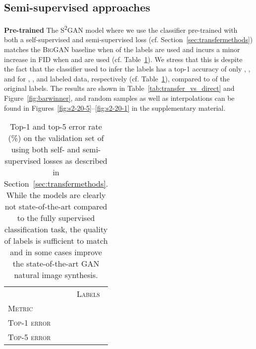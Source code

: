 \documentclass{article}
\newcommand{\tranSS}{\textsc{S\textsuperscript{2}GAN}}
\newcommand{\biggan}{\textsc{BigGAN}}
\begin{document}
\subsection{Semi-supervised approaches}
\textbf{Pre-trained}\quad
The \tranSS{} model where we use the classifier pre-trained with both a self-supervised and semi-supervised loss (cf. Section~\ref{sec:transfermethods}) matches the \biggan{} baseline when  of the labels are used and incurs a minor increase in FID when  and  are used (cf. Table~\ref{tab:semi_self_supervision}). We stress that this is despite the fact that the classifier used to infer the labels has a top-1 accuracy of only , , and  for , , and  labeled data, respectively (cf. Table~\ref{tab:semi_self_supervision}), compared to  of the original labels. The results are shown in Table~\ref{tab:transfer_vs_direct} and Figure~\ref{fig:barwinner}, and random samples as well as interpolations can be found in Figures~\ref{fig:s2-20-5}--\ref{fig:s2-20-1} in the supplementary material.
\begin{table}[b]
\centering
\caption{Top-1 and top-5 error rate (\%) on the \imagenet{} validation set of  using both self- and semi-supervised losses as described in Section~\ref{sec:transfermethods}. While the models are clearly not state-of-the-art compared to the fully supervised \imagenet{} classification task, the quality of labels is sufficient to match and in some cases improve the state-of-the-art GAN natural image synthesis.\vspace{0.2cm}}
\begin{tabular}{lrrr}
\toprule
&\multicolumn{3}{c}{\textsc{Labels}}\\
\textsc{Metric}  &    &     &     \\
\midrule
\textsc{Top-1 error} &   &  &  \\
\textsc{Top-5 error} &   &  &  \\
\bottomrule
\end{tabular} \label{tab:semi_self_supervision}
\end{table}
\end{document}
